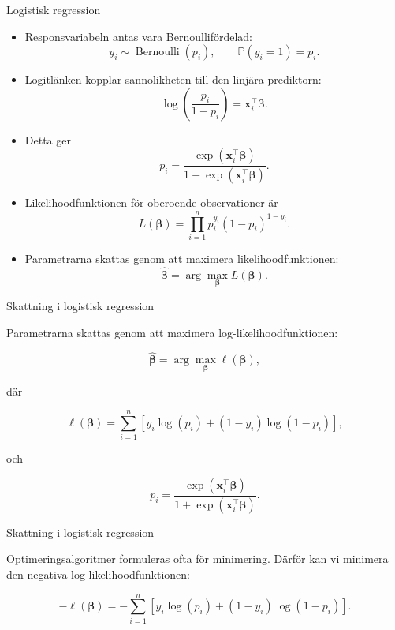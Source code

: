 \documentclass[10pt,english]{beamer}
\begin{document}
\begin{frame}{Logistisk regression}

\begin{itemize}
    \item Responsvariabeln antas vara Bernoullifördelad:
    \[
        y_i \sim \operatorname{Bernoulli}(p_i),
        \qquad
        \mathbb{P}(y_i=1)=p_i.
    \]

    \item Logitlänken kopplar sannolikheten till den linjära prediktorn:
    \[
        \log\left(\frac{p_i}{1-p_i}\right)
        =
        \boldsymbol{x}_i^\top\boldsymbol{\beta}.
    \]

    \item Detta ger
    \[
        p_i
        =
        \frac{\exp(\boldsymbol{x}_i^\top\boldsymbol{\beta})}
        {1+\exp(\boldsymbol{x}_i^\top\boldsymbol{\beta})}.
    \]

    \item Likelihoodfunktionen för oberoende observationer är
    \[
        L(\boldsymbol{\beta})
        =
        \prod_{i=1}^{n}
        p_i^{y_i}(1-p_i)^{1-y_i}.
    \]

    \item Parametrarna skattas genom att maximera likelihoodfunktionen:
    \[
        \widehat{\boldsymbol{\beta}}
        =
        \arg\max_{\boldsymbol{\beta}} L(\boldsymbol{\beta}).
    \]
\end{itemize}

\end{frame}



\begin{frame}{Skattning i logistisk regression}

Parametrarna skattas genom att maximera log-likelihoodfunktionen:

\[
\widehat{\boldsymbol{\beta}}
=
\arg\max_{\boldsymbol{\beta}}
\ell(\boldsymbol{\beta}),
\]

där

\[
\ell(\boldsymbol{\beta})
=
\sum_{i=1}^{n}
\left[
y_i\log(p_i)
+
(1-y_i)\log(1-p_i)
\right],
\]

och

\[
p_i
=
\frac{\exp(\boldsymbol{x}_i^\top\boldsymbol{\beta})}
{1+\exp(\boldsymbol{x}_i^\top\boldsymbol{\beta})}.
\]




\end{frame}


\begin{frame}{Skattning i logistisk regression}

Optimeringsalgoritmer formuleras ofta för minimering. Därför kan vi
minimera den negativa log-likelihoodfunktionen:

\[
-\ell(\boldsymbol{\beta})
=
-\sum_{i=1}^{n}
\left[
y_i\log(p_i)
+
(1-y_i)\log(1-p_i)
\right].
\]


\end{frame}
\end{document}
